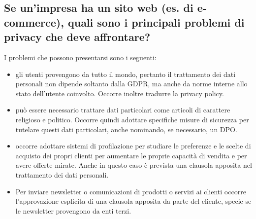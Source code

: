 \subsection{Se un’impresa ha un sito web (es. di e-commerce), quali sono i principali problemi di privacy
che deve affrontare?}

I problemi che possono presentarsi sono i seguenti:
\begin{itemize}
    \item gli utenti provengono da tutto il mondo, pertanto il trattamento dei dati personali non dipende soltanto dalla GDPR, ma anche da norme interne allo stato dell'utente coinvolto. Occorre inoltre tradurre la privacy policy.
    \item può essere necessario trattare dati particolari come articoli di carattere religioso e politico.
    Occorre quindi adottare specifiche misure di sicurezza per tutelare questi dati particolari, anche nominando, se necessario, un DPO.
    \item occorre adottare sistemi di profilazione per studiare le preferenze e le scelte di acquisto dei propri clienti per aumentare le proprie capacità di vendita e per avere offerte mirate. Anche in questo caso è prevista una clausola apposita nel trattamento dei dati personali.
    \item Per inviare newsletter o comunicazioni di prodotti o servizi ai clienti occorre l'approvazione esplicita di una clausola apposita da parte del cliente, specie se le newsletter provengono da enti terzi.

\end{itemize}